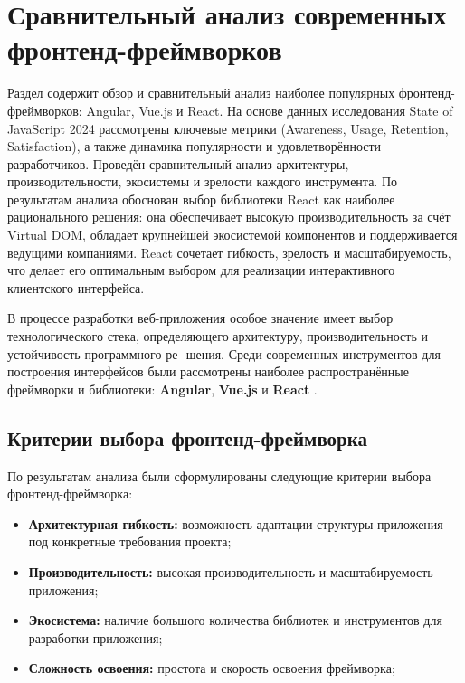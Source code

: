 \section{Сравнительный анализ современных фронтенд-фреймворков}
\begin{annotation}
	Раздел содержит обзор и сравнительный анализ наиболее популярных фронтенд-
	фреймворков: Angular, Vue.js и React. На основе данных исследования State of JavaScript 2024
	рассмотрены ключевые метрики (Awareness, Usage, Retention, Satisfaction), а также динамика
	популярности и удовлетворённости разработчиков. Проведён сравнительный анализ
	архитектуры, производительности, экосистемы и зрелости каждого инструмента. По результатам
	анализа обоснован выбор библиотеки React как наиболее рационального решения: 
	она обеспечивает высокую производительность за счёт Virtual DOM, обладает крупнейшей 
	экосистемой компонентов и поддерживается ведущими компаниями. React сочетает 
	гибкость, зрелость и масштабируемость, что делает его оптимальным выбором для
	реализации интерактивного клиентского интерфейса.
\end{annotation}

В процессе разработки веб-приложения особое значение имеет выбор технологического
стека, определяющего архитектуру, производительность и устойчивость программного ре-
шения. Среди современных инструментов для построения интерфейсов были рассмотрены
наиболее распространённые фреймворки и библиотеки: \textbf{Angular}, \textbf{Vue.js} и \textbf{React} \cite{state-of-javascript, indonesian}.

\subsection{Критерии выбора фронтенд-фреймворка}

По результатам анализа были сформулированы следующие критерии выбора фронтенд-фреймворка:

\begin{itemize}
	\item \textbf{Архитектурная гибкость:} возможность адаптации структуры приложения под конкретные требования проекта;
	\item \textbf{Производительность:} высокая производительность и масштабируемость приложения;
	\item \textbf{Экосистема:} наличие большого количества библиотек и инструментов для разработки приложения;
	\item \textbf{Сложность освоения:} простота и скорость освоения фреймворка;
\end{itemize}

